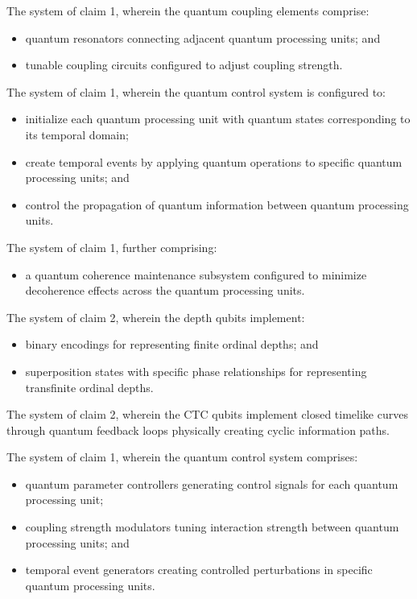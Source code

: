 \documentclass[12pt,letterpaper]{article}
\begin{document}
\begin{patentclaims}
    \item The system of claim 1, wherein the quantum coupling elements comprise:
    \begin{itemize}[leftmargin=2em]
        \item quantum resonators connecting adjacent quantum processing units; and
        \item tunable coupling circuits configured to adjust coupling strength.
    \end{itemize}
    
    \item The system of claim 1, wherein the quantum control system is configured to:
    \begin{itemize}[leftmargin=2em]
        \item initialize each quantum processing unit with quantum states corresponding to its temporal domain;
        \item create temporal events by applying quantum operations to specific quantum processing units; and
        \item control the propagation of quantum information between quantum processing units.
    \end{itemize}
    
    \item The system of claim 1, further comprising:
    \begin{itemize}[leftmargin=2em]
        \item a quantum coherence maintenance subsystem configured to minimize decoherence effects across the quantum processing units.
    \end{itemize}
    
    \item The system of claim 2, wherein the depth qubits implement:
    \begin{itemize}[leftmargin=2em]
        \item binary encodings for representing finite ordinal depths; and
        \item superposition states with specific phase relationships for representing transfinite ordinal depths.
    \end{itemize}
    
    \item The system of claim 2, wherein the CTC qubits implement closed timelike curves through quantum feedback loops physically creating cyclic information paths.
    
    \item The system of claim 1, wherein the quantum control system comprises:
    \begin{itemize}[leftmargin=2em]
        \item quantum parameter controllers generating control signals for each quantum processing unit;
        \item coupling strength modulators tuning interaction strength between quantum processing units; and
        \item temporal event generators creating controlled perturbations in specific quantum processing units.
    \end{itemize}
    

\end{patentclaims}
\end{document}
